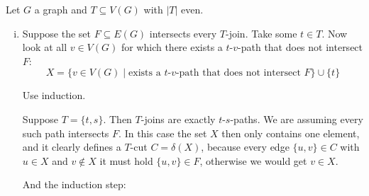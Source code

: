\newcommand{\sheet}{5}




\maketitle

\begin{exercise}{3}
    Let $G$ a graph and $T \subseteq V(G)$ with $|T|$ even.
    \begin{enumerate}[i)]
        \item{
                Suppose the set $F \subseteq E(G)$ intersects every $T$-join.
                Take some $t \in T$. Now look at all $v \in V(G)$ for which
                there exists a $t$-$v$-path that does not intersect $F$:
                \begin{equation*}
                    X = \{ v \in V(G) \mid \text{exists a $t$-$v$-path that does
                    not intersect $F$} \} \cup \{t\}
                \end{equation*}

                Use induction.

                Suppose $T = \{t, s\}$. Then $T$-joins are exactly
                $t$-$s$-paths. We are assuming every such path intersects $F$.
                In this case the set $X$ then only contains one element, and it
                clearly defines a $T$-cut $C = \delta(X)$, because every edge
                $\{u, v\} \in C$ with $u \in X$ and $v \notin X$ it must hold
                $\{u, v\} \in F$, otherwise we would get $v \in X$.

                And the induction step:

}
\end{enumerate}
\end{exercise}
